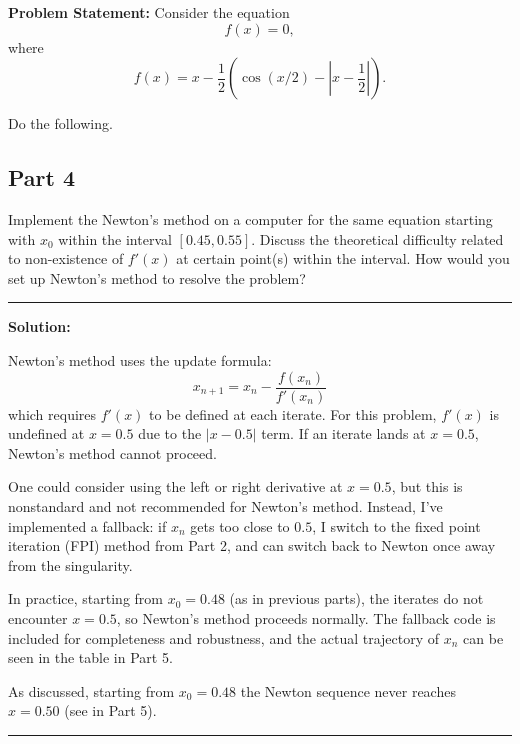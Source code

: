 \clearpage
{}

\textbf{Problem Statement:} Consider the equation
$$f(x) = 0,$$
where
$$f(x) = x - \frac{1}{2}\left(\cos(x/2) - \left|x - \frac{1}{2}\right|\right).$$

Do the following.

\subsection*{Part 4}

Implement the Newton’s method on a computer for the same equation starting with $x_0$ within the interval $[0.45, 0.55]$. Discuss the theoretical difficulty related to non-existence of $f'(x)$ at certain point(s) within the interval. How would you set up Newton’s method to resolve the problem?

\noindent\rule{\textwidth}{0.4pt}

\vspace{1em}

\textbf{Solution:}

Newton's method uses the update formula:
\[
    x_{n+1} = x_n - \frac{f(x_n)}{f'(x_n)}
\]
which requires $f'(x)$ to be defined at each iterate. For this problem, $f'(x)$ is undefined at $x = 0.5$ due to the $|x-0.5|$ term. If an iterate lands at $x = 0.5$, Newton's method cannot proceed.

One could consider using the left or right derivative at $x=0.5$, but this is nonstandard and not recommended for Newton's method. Instead, I've implemented a fallback: if $x_n$ gets too close to $0.5$, I switch to the fixed point iteration (FPI) method from Part 2, and can switch back to Newton once away from the singularity.

In practice, starting from $x_0 = 0.48$ (as in previous parts), the iterates do not encounter $x=0.5$, so Newton's method proceeds normally. The fallback code is included for completeness and robustness, and the actual trajectory of $x_n$ can be seen in the table in Part 5.

As discussed, starting from $x_0=0.48$ the Newton sequence never reaches $x=0.50$ (see  in Part 5).

\vspace{2em}
\noindent\rule{\textwidth}{0.4pt}



